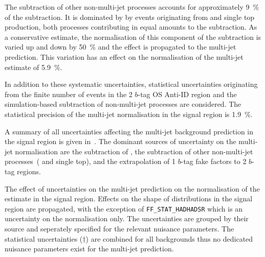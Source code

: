 The subtraction of other non-multi-jet processes accounts for
approximately \SI{9}{\percent} of the subtraction. It is dominated by
by events originating from \Vjets and single top production, both
processes contributing in equal amounts to the subtraction. As a
conservative estimate, the normalisation of this component of the
subtraction is varied up and down by \SI{50}{\percent} and the effect
is propagated to the multi-jet prediction. This variation has an
effect on the normalisation of the multi-jet estimate of
\SI{5.9}{\percent}.

In addition to these systematic uncertainties, statistical
uncertainties originating from the finite number of events in the 2
$b$-tag OS Anti-ID region and the simulation-based subtraction of
non-multi-jet processes are considered. The statistical precision of
the multi-jet normalisation in the signal region is
\SI{1.9}{\percent}.

A summary of all uncertainties affecting the multi-jet background
prediction in the signal region is given
in~. The dominant sources of
uncertainty on the multi-jet normalisation are the subtraction of
\ttbarFakes, the subtraction of other non-multi-jet processes~(\Vjets
and single top), and the extrapolation of 1 $b$-tag fake factors to 2
$b$-tag regions.

\begin{table}[htbp]
  \centering

  \caption{The effect of uncertainties on the multi-jet prediction on
    the normalisation of the estimate in the \hadhad signal
    region. Effects on the shape of distributions in the signal region
    are propagated, with the exception of \texttt{FF\_STAT\_HADHADSR}
    which is an uncertainty on the normalisation only. The
    uncertainties are grouped by their source and seperately specified
    for the relevant nuisance parameters. The statistical
    uncertainties ($\dagger$) are combined for all backgrounds thus no
    dedicated nuisance parameters exist for the multi-jet prediction.}%
  \label{tab:multi_jet_uncertainties}

  
\end{table}





